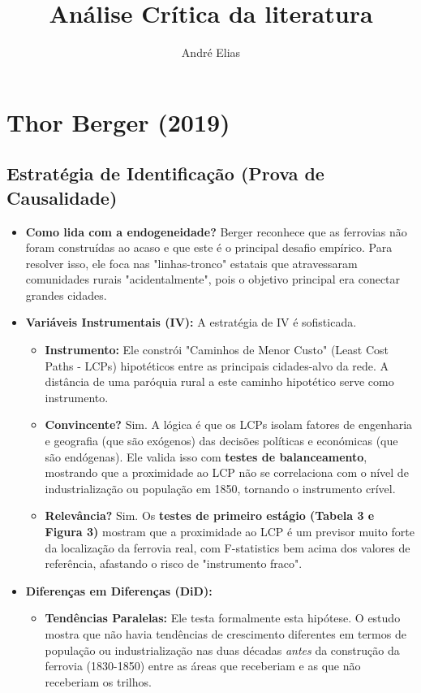 \documentclass[12pt, a4paper]{article}
\title{Análise Crítica da literatura}
\author{André Elias}
\date{}
\begin{document}
\maketitle
\thispagestyle{empty}

\section{Thor Berger (2019)}

\subsection{Estratégia de Identificação (Prova de Causalidade)}

\begin{itemize}
    \item \textbf{Como lida com a endogeneidade?} Berger reconhece que as ferrovias não foram construídas ao acaso e que este é o principal desafio empírico. Para resolver isso, ele foca nas "linhas-tronco" estatais que atravessaram comunidades rurais "acidentalmente", pois o objetivo principal era conectar grandes cidades.

    \item \textbf{Variáveis Instrumentais (IV):} A estratégia de IV é sofisticada.
    \begin{itemize}
        \item \textbf{Instrumento:} Ele constrói "Caminhos de Menor Custo" (Least Cost Paths - LCPs) hipotéticos entre as principais cidades-alvo da rede. A distância de uma paróquia rural a este caminho hipotético serve como instrumento.
        \item \textbf{Convincente?} Sim. A lógica é que os LCPs isolam fatores de engenharia e geografia (que são exógenos) das decisões políticas e económicas (que são endógenas). Ele valida isso com \textbf{testes de balanceamento}, mostrando que a proximidade ao LCP não se correlaciona com o nível de industrialização ou população em 1850, tornando o instrumento crível.
        \item \textbf{Relevância?} Sim. Os \textbf{testes de primeiro estágio (Tabela 3 e Figura 3)} mostram que a proximidade ao LCP é um previsor muito forte da localização da ferrovia real, com F-statistics bem acima dos valores de referência, afastando o risco de "instrumento fraco".
    \end{itemize}

    \item \textbf{Diferenças em Diferenças (DiD):}
    \begin{itemize}
        \item \textbf{Tendências Paralelas:} Ele testa formalmente esta hipótese. O estudo mostra que não havia tendências de crescimento diferentes em termos de população ou industrialização nas duas décadas \textit{antes} da construção da ferrovia (1830-1850) entre as áreas que receberiam e as que não receberiam os trilhos.
    \end{itemize}


\end{itemize}
\end{document}
